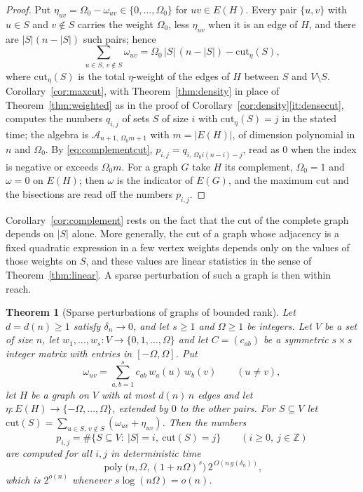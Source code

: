 \documentclass[11pt,reqno]{amsart}
\numberwithin{equation}{section}
\theoremstyle{plain}
\newtheorem{theorem}{Theorem}[section]
\theoremstyle{definition}
\theoremstyle{remark}
\DeclareMathOperator{\poly}{poly}
\newcommand{\A}{\mathcal{A}}
\newcommand{\Z}{\mathbb{Z}}
\begin{document}
\begin{proof}
Put $\eta_{uv}=\Omega_0-\omega_{uv}\in\{0,\dots,\Omega_0\}$ for $uv\in E(H)$. Every pair
$\{u,v\}$ with $u\in S$ and $v\notin S$ carries the weight $\Omega_0$, less
$\eta_{uv}$ when it is an edge of $H$, and there are $|S|(n-|S|)$ such pairs; hence
\begin{equation}\label{eq:complementcut}
  \sum_{u\in S,\,v\notin S}\omega_{uv}=\Omega_0\,|S|\,(n-|S|)-\mathrm{cut}_\eta(S),
\end{equation}
where $\mathrm{cut}_\eta(S)$ is the total $\eta$-weight of the edges of $H$ between $S$
and $V\setminus S$. Corollary~\ref{cor:maxcut}, with Theorem~\ref{thm:density} in place
of Theorem~\ref{thm:weighted} as in the proof of Corollary~\ref{cor:density}\ref{it:densecut},
computes the numbers $q_{i,j}$ of sets $S$ of size $i$ with $\mathrm{cut}_\eta(S)=j$ in
the stated time; the algebra is $\A_{n+1,\,\Omega_0m+1}$ with $m=|E(H)|$, of dimension
polynomial in $n$ and $\Omega_0$. By \eqref{eq:complementcut},
$p_{i,j}=q_{i,\,\Omega_0i(n-i)-j}$, read as $0$ when the index is negative or exceeds
$\Omega_0 m$. For a graph $G$ take $H$ its complement, $\Omega_0=1$ and $\omega=0$ on
$E(H)$; then $\omega$ is the indicator of $E(G)$, and the maximum cut and the bisections
are read off the numbers $p_{i,j}$.
\end{proof}

Corollary~\ref{cor:complement} rests on the fact that the cut of the complete graph
depends on $|S|$ alone. More generally, the cut of a graph whose adjacency is a
fixed quadratic expression in a few vertex weights depends only on the values of
those weights on $S$, and these values are linear statistics in the sense of
Theorem~\ref{thm:linear}. A sparse perturbation of such a graph is then within reach.

\begin{theorem}[Sparse perturbations of graphs of bounded rank]\label{thm:lowrank}
Let $d=d(n)\ge1$ satisfy $\delta_n\to0$, and let $s\ge1$ and $\Omega\ge1$ be integers.
Let $V$ be a set of size $n$, let $w_1,\dots,w_s:V\to\{0,1,\dots,\Omega\}$ and let
$C=(c_{ab})$ be a symmetric $s\times s$ integer matrix with entries in
$[-\Omega,\Omega]$. Put
\[
  \omega_{uv}=\sum_{a,b=1}^{s}c_{ab}\,w_a(u)\,w_b(v)\qquad(u\ne v),
\]
let $H$ be a graph on $V$ with at most $d(n)\,n$ edges and let
$\eta:E(H)\to\{-\Omega,\dots,\Omega\}$, extended by $0$ to the other pairs. For
$S\subseteq V$ let $\mathrm{cut}(S)=\sum_{u\in S,\,v\notin S}(\omega_{uv}+\eta_{uv})$.
Then the numbers
\[
  p_{i,j}=\#\{S\subseteq V:\ |S|=i,\ \mathrm{cut}(S)=j\}\qquad(i\ge0,\ j\in\Z)
\]
are computed for all $i,j$ in deterministic time
\[
  \poly\bigl(n,\Omega,(1+n\Omega)^{s}\bigr)\,2^{\,O(n\,g(\delta_n))},
\]
which is $2^{o(n)}$ whenever $s\log(n\Omega)=o(n)$.
\end{theorem}
\end{document}

